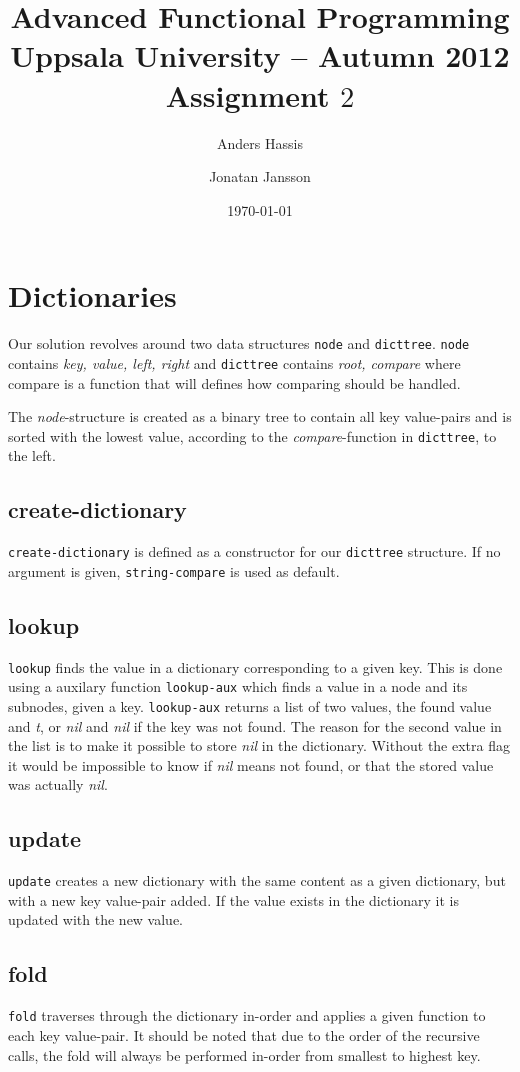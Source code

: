 \documentclass[a4paper,11pt]{article}
\title{\textbf{Advanced Functional Programming \\
    Uppsala University -- Autumn 2012 \\
    Assignment $2$ %
  }
}
\author{Anders Hassis \and Jonatan Jansson}
\date{\today}
\begin{document}
\maketitle

\section{Dictionaries}

Our solution revolves around two data structures \texttt{node} and \texttt{dicttree}. \texttt{node} contains \emph{key, value, left, right} and \texttt{dicttree} contains \emph{root, compare} where compare is a function that will defines how comparing should be handled.

The \emph{node}-structure is created as a binary tree to contain all key value-pairs and is sorted with the lowest value, according to the \emph{compare}-function in \texttt{dicttree}, to the left.

\subsection{create-dictionary}
\texttt{create-dictionary} is defined as a constructor for our \texttt{dicttree} structure. If no argument is given, \texttt{string-compare} is used as default.

\subsection{lookup}
\texttt{lookup} finds the value in a dictionary corresponding to a given key. This is done using a auxilary function \texttt{lookup-aux} which finds a value in a node and its subnodes, given a key. \texttt{lookup-aux} returns a list of two values, the found value and \emph{t}, or \emph{nil} and \emph{nil} if the key was not found. The reason for the second value in the list is to make it possible to store \emph{nil} in the dictionary. Without the extra flag it would be impossible to know if \emph{nil} means not found, or that the stored value was actually \emph{nil}.

\subsection{update}
\texttt{update} creates a new dictionary with the same content as a given dictionary, but with a new key value-pair added. If the value exists in the dictionary it is updated with the new value.

\subsection{fold}
\texttt{fold} traverses through the dictionary in-order and applies a given function to each key value-pair. It should be noted that due to the order of the recursive calls, the fold will always be performed in-order from smallest to highest key.
\end{document}
